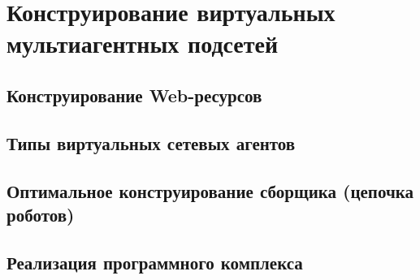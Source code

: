 \chapter{Конструирование виртуальных мультиагентных подсетей}\label{ch:ch4}

\section{Конструирование Web-ресурсов}\label{sec:ch4/sect1}

\section{Типы виртуальных сетевых агентов}\label{sec:ch4/sect2}

\section{Оптимальное конструирование сборщика (цепочка роботов)}\label{sec:ch4/sect3}

\section{Реализация программного комплекса}\label{sec:ch4/sect3}

